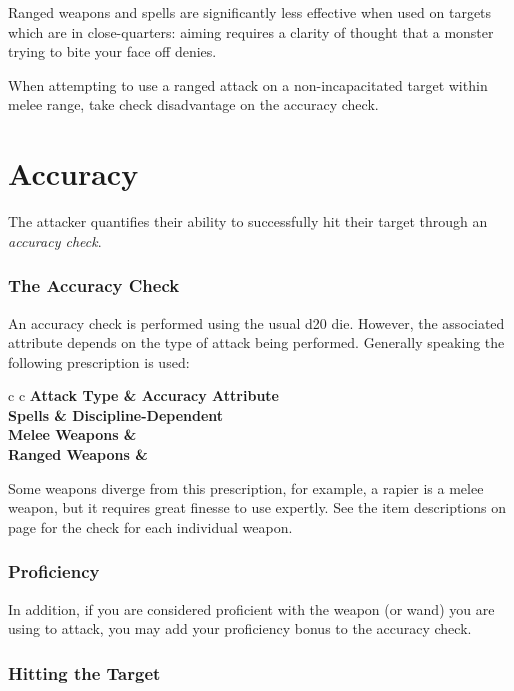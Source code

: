 Ranged weapons and spells are significantly less effective when used on targets which are in close-quarters: aiming requires a clarity of thought that a monster trying to bite your face off denies. 

When attempting to use a ranged attack on a non-incapacitated target within melee range, take check disadvantage on the accuracy check.

\section{Accuracy}

The attacker quantifies their ability to successfully hit their target through an {\it accuracy check}. 

\subsubsection{The Accuracy Check}

An accuracy check is performed using the usual d20 die. However, the associated attribute depends on the type of attack being performed. Generally speaking the following prescription is used:

\begin{center}
\begin{rndtable}{c c}
\bf Attack Type	&	\bf Accuracy Attribute
\\
Spells	&	Discipline-Dependent
\\
Melee Weapons	& \attPhys{}
\\
Ranged Weapons	&	\attFin{}
\end{rndtable}
\end{center}

Some weapons diverge from this prescription, for example, a rapier is a melee weapon, but it requires great finesse to use expertly. See the item descriptions on page \pageref{S:WeaponList} for the check for each individual weapon. 

\subsubsection{Proficiency}

In addition, if you are considered proficient with the weapon (or wand) you are using to attack, you may add your proficiency bonus to the accuracy check. 

\subsubsection{Hitting the Target}

